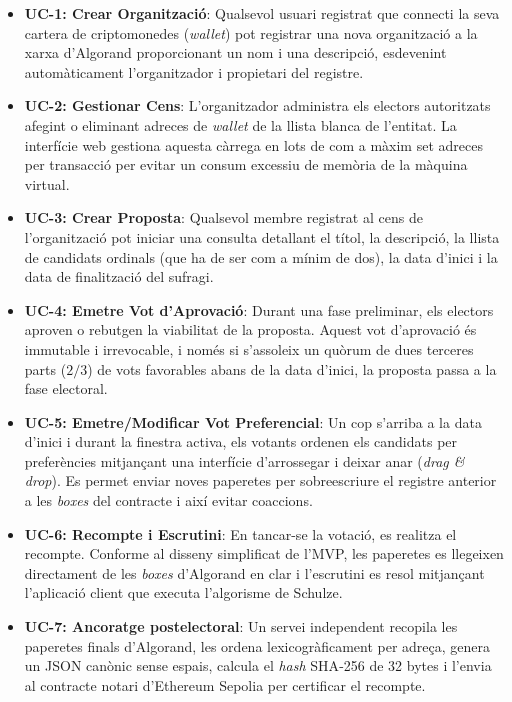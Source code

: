 \begin{itemize}
    \item \textbf{UC-1: Crear Organització}: Qualsevol usuari registrat que connecti la seva cartera de criptomonedes
    (\textit{wallet}) pot registrar una nova organització a la xarxa d'Algorand proporcionant un nom i una descripció,
    esdevenint automàticament l'organitzador i propietari del registre.

    \item \textbf{UC-2: Gestionar Cens}: L'organitzador administra els electors autoritzats afegint o eliminant adreces
    de \textit{wallet} de la llista blanca de l'entitat.
    La interfície web gestiona aquesta càrrega en lots de com a màxim set adreces per transacció per evitar un consum
    excessiu de memòria de la màquina virtual.

    \item \textbf{UC-3: Crear Proposta}: Qualsevol membre registrat al cens de l'organització pot iniciar una consulta
    detallant el títol, la descripció, la llista de candidats ordinals (que ha de ser com a mínim de dos), la data
    d'inici i la data de finalització del sufragi.

    \item \textbf{UC-4: Emetre Vot d'Aprovació}: Durant una fase preliminar, els electors aproven o rebutgen la
    viabilitat de la proposta.
    Aquest vot d'aprovació és immutable i irrevocable, i només si s'assoleix un quòrum de dues terceres parts ($2/3$) de
    vots favorables abans de la data d'inici, la proposta passa a la fase electoral.

    \item \textbf{UC-5: Emetre/Modificar Vot Preferencial}: Un cop s'arriba a la data d'inici i durant la finestra
    activa, els votants ordenen els candidats per preferències mitjançant una interfície d'arrossegar i deixar anar
    (\textit{drag \& drop}).
    Es permet enviar noves paperetes per sobreescriure el registre anterior a les \textit{boxes} del contracte i així
    evitar coaccions.

    \item \textbf{UC-6: Recompte i Escrutini}: En tancar-se la votació, es realitza el recompte.
    Conforme al disseny simplificat de l'\ac{MVP}, les paperetes es llegeixen directament de les \textit{boxes}
    d'Algorand en clar i l'escrutini es resol mitjançant l'aplicació client que executa l'algorisme de Schulze.

    \item \textbf{UC-7: Ancoratge postelectoral}: Un servei independent recopila les paperetes finals d'Algorand, les
    ordena lexicogràficament per adreça, genera un \ac{JSON} canònic sense espais, calcula el \textit{hash}
    \ac{SHA}-256 de 32 bytes i l'envia al contracte notari d'Ethereum Sepolia per certificar el recompte.


\end{itemize}
